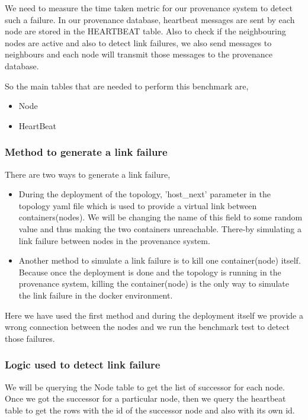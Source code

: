 We need to measure the time taken metric for our provenance system to detect such a failure. In our provenance database, heartbeat messages are sent by each node are stored in the HEARTBEAT table. Also to check if the neighbouring nodes are active and also to detect link failures, we also send messages to neighbours and each node will transmit those messages to the provenance database. 

So the main tables that are needed to perform this benchmark are,
    \begin{itemize}
        \item Node
        \item HeartBeat
    \end{itemize}

\subsubsection{Method to generate a link failure}

There are two ways to generate a link failure,
    \begin{itemize}
        \item During the deployment of the topology, 'host\_next' parameter in the topology yaml file which is used to provide a virtual link between containers(nodes). We will be changing the name of this field to some random value and thus making the two containers unreachable. There-by simulating a link failure between nodes in the provenance system.
        \item Another method to simulate a link failure is to kill one container(node) itself. Because once the deployment is done and the topology is running in the provenance system, killing the container(node) is the only way to simulate the link failure in the docker environment.
    \end{itemize}

Here we have used the first method and during the deployment itself we provide a wrong connection between the nodes and we run the benchmark test to detect those failures.

\subsubsection{Logic used to detect link failure}

We will be querying the Node table to get the list of successor for each node. Once we got the successor for a particular node, then we query the heartbeat table to get the rows with the id of the successor node and also with its own id.

